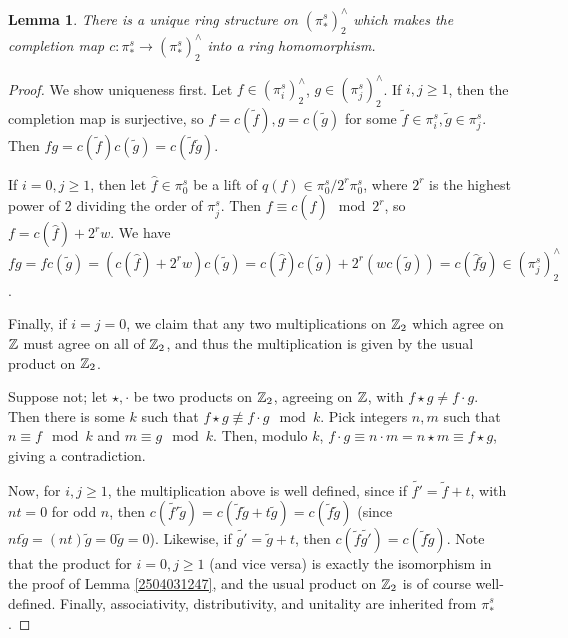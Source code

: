 \documentclass[11pt, titlepage]{article} %
\def\inte{\ensuremath\mathbb{Z}}
\numberwithin{equation}{subsection}
\theoremstyle{plain}
\newtheorem{lemma}[theorem]{Lemma}
\theoremstyle{definition}
\begin{document}
\begin{lemma}\label{2504071013}
There is a unique ring structure on \((\pi_*^s)^\wedge_2\) which makes the completion map \(c : \pi_*^s \to (\pi_*^s)^\wedge_2\) into a ring homomorphism. 
\end{lemma}

\begin{proof}
We show uniqueness first. Let \(f \in (\pi_i^s)^\wedge_2\), \(g \in (\pi_j^s)^\wedge_2\). If \(i,j \geq 1\), then the completion map is surjective, so \(f=c(\tilde f), g = c(\tilde g)\) for some \(\tilde f \in \pi_i^s, \tilde g \in \pi_j^s\). Then \(fg=c(\tilde f)c(\tilde g)=c(\tilde f \tilde g)\).

If \(i=0, j\geq 1\), then let \(\hat f\in \pi_0^s\) be a lift of \(q(f)\in \pi_0^s/2^r\pi_0^s\), where \(2^r\) is the highest power of 2 dividing the order of \(\pi_j^s\). Then \(f\equiv c(\hat f) \mod 2^r\), so \(f=c(\hat f) + 2^rw\). We have \(fg=fc(\tilde g)=(c(\hat f) + 2^r w)c(\tilde g)=c(\hat f) c(\tilde g)+2^r(wc(\tilde g))=c(\hat f \tilde g)\in (\pi_j^s)^\wedge_2\). 

Finally, if \(i=j=0\), we claim that any two multiplications on \(\inte_2\) which agree on \(\inte\) must agree on all of \(\inte_2\), and thus the multiplication is given by the usual product on \(\inte_2\). 

Suppose not; let \(\star, \cdot\) be two products on \(\inte_2\), agreeing on \(\inte\), with \(f\star g \neq f \cdot g\). Then there is some \(k\) such that \(f \star g \not\equiv f \cdot g \mod k\). Pick integers \(n, m\) such that \(n\equiv f \mod k\) and \(m \equiv g \mod k\). Then, modulo \(k\), \(f\cdot g \equiv n\cdot m =n\star m \equiv f \star g\), giving a contradiction.

Now, for \(i, j \geq 1\), the multiplication above is well defined, since if \(\tilde{f'}=\tilde f+t\), with \(nt=0\) for odd \(n\), then \(c(\tilde{f'}\tilde g)=c(\tilde f \tilde g + t\tilde g)=c(\tilde f \tilde g)\) (since \(nt\tilde g=(nt)\tilde g = 0\tilde g = 0\)). Likewise, if \(\tilde{g'}=\tilde g + t\), then \(c(\tilde f \tilde{g'})=c(\tilde f \tilde g)\). Note that the product for \(i=0, j \geq 1\)  (and vice versa) is exactly the isomorphism in the proof of Lemma  \ref{2504031247}, and the usual product on \(\inte_2\) is of course well-defined. Finally, associativity, distributivity, and unitality are inherited from \(\pi_*^s\). 
\end{proof}
\end{document}
